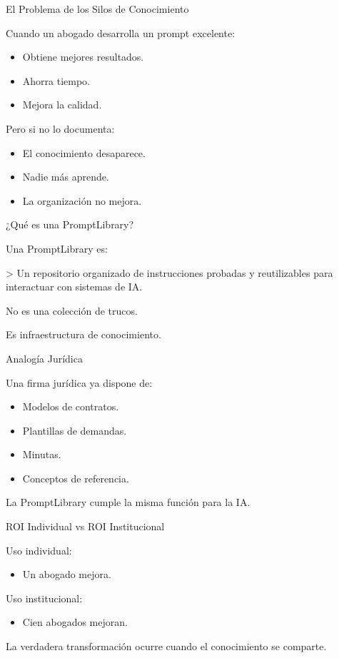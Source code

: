 \documentclass[aspectratio=169]{beamer}
\begin{document}
\begin{frame}{El Problema de los Silos de Conocimiento}


Cuando un abogado desarrolla un prompt excelente:

\begin{itemize}
  \item Obtiene mejores resultados.
  \item Ahorra tiempo.
  \item Mejora la calidad.
\end{itemize}
Pero si no lo documenta:

\begin{itemize}
  \item El conocimiento desaparece.
  \item Nadie más aprende.
  \item La organización no mejora.
\end{itemize}
\end{frame}

\begin{frame}{¿Qué es una PromptLibrary?}


Una PromptLibrary es:

> Un repositorio organizado de instrucciones probadas y reutilizables para interactuar con sistemas de IA.

No es una colección de trucos.

Es infraestructura de conocimiento.

\end{frame}

\begin{frame}{Analogía Jurídica}


Una firma jurídica ya dispone de:

\begin{itemize}
  \item Modelos de contratos.
  \item Plantillas de demandas.
  \item Minutas.
  \item Conceptos de referencia.
\end{itemize}
La PromptLibrary cumple la misma función para la IA.

\end{frame}

\begin{frame}{ROI Individual vs ROI Institucional}


Uso individual:

\begin{itemize}
  \item Un abogado mejora.
\end{itemize}
Uso institucional:

\begin{itemize}
  \item Cien abogados mejoran.
\end{itemize}
La verdadera transformación ocurre cuando el conocimiento se comparte.

\end{frame}
\end{document}
